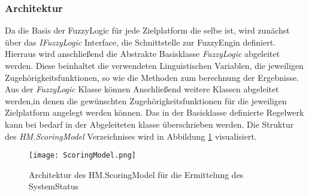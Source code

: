 \subsubsection*{Architektur}
Da die Basis der FuzzyLogic für jede Zielplatform die selbe ist, wird zunächst über das \textit{IFuzzyLogic} Interface, die Schnittstelle zur FuzzyEngin definiert. Hierraus wird anschließend die Abstrakte Basisklasse \textit{FuzzyLogic} abgeleitet werden. Diese beinhaltet die verwendeten Linguistischen Variablen, die jeweiligen Zugehörigkeitsfunktionen, so wie die Methoden zum berechnung der Ergebnisse.\\
Aus der \textit{FuzzyLogic} Klasse können Anschließend weitere Klassen abgeleitet werden,in denen die gewünschten Zugehörigkeitsfunktionen für die jeweiligen Zielplatform angelegt werden können. Das in der Basisklasse definierte Regelwerk kann bei bedarf in der Abgeleiteten klasse überschrieben werden. Die Struktur des \textit{HM.ScoringModel} Verzeichnises wird in Abbildung \ref{fig:ScoringModel} visualisiert.  
\begin{center}
    \begin{figure}[h!]
        \centering
        \texttt{[image: ScoringModel.png]}
        \caption{Architektur des HM.ScoringModel für die Ermittelung des SystemStatus}
        \label{fig:ScoringModel}
    \end{figure}
\end{center}

